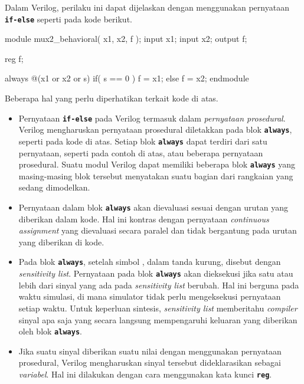 \documentclass[a4paper,11pt,bahasa]{extarticle}
\begin{document}
Dalam Verilog, perilaku ini dapat dijelaskan dengan menggunakan
pernyataan {\tt \bf if-else} seperti pada kode berikut.
{
\begin{verilogcode}
module mux2_behavioral( x1, x2, f );
  input x1;
  input x2;
  output f;

  reg f;

  always @(x1 or x2 or s)
    if( s == 0 )
      f = x1;
    else
      f = x2;
endmodule
\end{verilogcode}
}

Beberapa hal yang perlu diperhatikan terkait kode di atas.

\begin{itemize}
\item Pernyataan {\tt\textbf{if-else}} pada Verilog termasuk dalam
\textit{pernyataan prosedural}.
Verilog mengharuskan pernyataan prosedural diletakkan pada blok
{\tt\textbf{always}},
seperti pada kode di atas. Setiap blok {\tt\textbf{always}} dapat terdiri dari satu
pernyataan, seperti pada contoh di atas, atau beberapa pernyataan prosedural.
Suatu modul Verilog dapat memiliki beberapa
blok {\tt\textbf{always}} yang masing-masing blok tersebut menyatakan suatu bagian
dari rangkaian yang sedang dimodelkan.
\item Pernyataan dalam blok {\tt\textbf{always}} akan dievaluasi sesuai dengan urutan yang
diberikan dalam kode. Hal ini kontras dengan pernyataan
\textit{continuous assignment}
yang dievaluasi secara paralel dan tidak bergantung pada urutan yang diberikan
di kode.
\item Pada blok {\tt\textbf{always}}, setelah simbol \textbf{\@},
dalam tanda kurung, disebut
dengan \textit{sensitivity list}. Pernyataan pada blok {\tt\textbf{always}} akan dieksekusi
jika satu atau lebih dari sinyal yang ada pada {\it sensitivity list} berubah.
Hal ini berguna pada waktu simulasi, di mana simulator tidak perlu mengeksekusi
pernyataan setiap waktu.
Untuk keperluan sintesis, \textit{sensitivity list} memberitahu
\textit{compiler} sinyal
apa saja yang secara langsung mempengaruhi keluaran yang diberikan oleh blok
{\tt\textbf{always}}.
\item Jika suatu sinyal diberikan suatu nilai dengan menggunakan pernyataan
prosedural, Verilog mengharuskan sinyal tersebut dideklarasikan sebagai
\textit{variabel}. Hal ini dilakukan dengan cara menggunakan kata kunci
{\tt\textbf{reg}}.
\end{itemize}







\appendix


\end{document}
